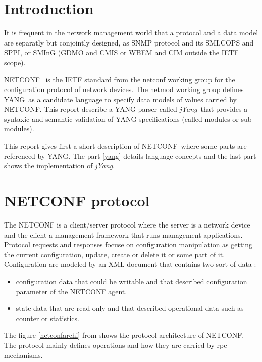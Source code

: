 \documentclass[a4paper]{article}
\newcommand{\jyang}{{\sl jYang}}
\newcommand{\nc}{NETCONF}
\newcommand{\y}{YANG}
\begin{document}
\makeRT  %

\section{Introduction}

It is frequent  in the network management world that  a protocol and a
data    model   are    separatly   but    conjointly    designed,   as
SNMP\cite{rfc1157}             protocol             and            its
SMI\cite{rfc1155},CO\-PS\cite{rfc2748}  and  SP\-PI\cite{rfc3159},  or
SMI\-nG\cite{rfc3780} (GDMO and CMIS or  WBEM and CIM outside the IETF
scope).

\nc\  \cite{rfc4741} is  the IETF  standard from  the  netconf working
group for  the configuration protocol  of network devices.  The netmod
working  group defines  \y\ as  a candidate  language to  specify data
models of  values carried by \nc.  This report describe  a YANG parser
called  \jyang\ that provides  a syntaxic  and semantic  validation of
YANG specifications (called modules or sub-modules).

This report  gives first a short  description of \nc\  where some parts
are referenced  by \y. The  part \ref{yang} details  language concepts
and the last part shows the implementation of \jyang.


\section{NETCONF protocol}

The NETCONF is a client/server  protocol where the server is a network
device  and the  client a  management framework  that  runs management
applications. Protocol requests  and responses focuse on configuration
manipulation as  getting the current configuration,  update, create or
delete it  or some  part of  it. Configuration are  modeled by  an XML
document that contains two sort of data :
\begin{itemize}
\item
configuration  data   that  could  be  writable   and  that  described
configuration parameter of the NETCONF agent.
\item
state data that are read-only and that described operational data such
as counter or statistics.
\end{itemize}

The  figure \ref{netconfarchi}  from
\cite{rfc4741}  shows  the   protocol  architecture  of  NETCONF.  The
protocol mainly defines operations  and how they
are carried by rpc mechanisms.
\end{document}
